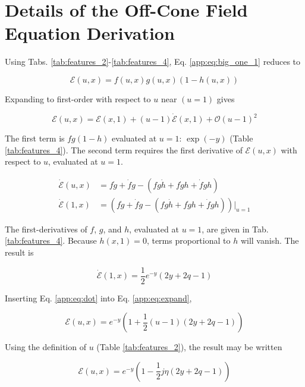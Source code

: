 \documentclass[amsmath,amssymb,aps,prd,10pt,twocolumn]{revtex4}
\begin{document}
\section{Details of the Off-Cone Field Equation Derivation}
\label{app:b}

Using Tabs. \ref{tab:features_2}-\ref{tab:features_4}, Eq. \ref{app:eq:big_one_1} reduces to

\begin{equation}
\mathcal{E}(u,x) = f(u,x)g(u,x)(1-h(u,x))
\end{equation}

Expanding to first-order with respect to $u$ near $(u = 1)$ gives

\begin{equation}
\mathcal{E}(u,x) = \mathcal{E}(x,1) + (u-1) \dot{\mathcal{E}}(x,1) + \mathcal{O}(u-1)^2 \label{app:eq:expand}
\end{equation}

The first term is $fg(1-h)$ evaluated at $u = 1$: $\exp(-y)$ (Table \ref{tab:features_4}).  The second term requires the first derivative of $\mathcal{E}(u,x)$ with respect to $u$, evaluated at $u = 1$.

\begin{align}
\dot{\mathcal{E}}(u,x) &= f\dot{g} + \dot{f} g - (f g \dot{h} + f\dot{g} h + \dot{f} g h) \\
\dot{\mathcal{E}}(1,x) &= \left(f\dot{g} + \dot{f} g - (f g \dot{h} + f\dot{g} h + \dot{f} g h)\right)|_{u=1}
\end{align}

The first-derivatives of $f$, $g$, and $h$, evaluated at $u = 1$, are given in Tab. \ref{tab:features_4}.  Because $h(x,1) = 0$, terms proportional to $h$ will vanish.  The result is

\begin{equation}
\dot{\mathcal{E}}(1,x) = \frac{1}{2} e^{-y} \left(2 y + 2q - 1\right) \label{app:eq:dot}
\end{equation}

Inserting Eq. \ref{app:eq:dot} into Eq. \ref{app:eq:expand},

\begin{equation}
\mathcal{E}(u,x) = e^{-y} \left( 1 + \frac{1}{2} (u-1)\left(  2 y + 2q - 1 \right) \right)
\end{equation}

Using the definition of $u$ (Table \ref{tab:features_2}), the result may be written

\begin{equation}
\mathcal{E}(u,x) = e^{-y} \left( 1 - \frac{1}{2} j\eta\left( 2y + 2q - 1 \right) \right)
\end{equation}
\end{document}

